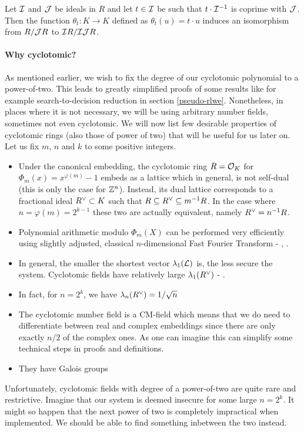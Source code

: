\begin{proposition}\label{sigma-t}
	Let $\mathcal{I}$ and $\mathcal{J}$ be ideals in $R$ and let $t \in \mathcal{I}$ be such that $t \cdot \mathcal{I}^{-1}$ is coprime with $\mathcal{J}$. Then the function $\theta_t : K \rightarrow K$ defined as $\theta_t(u) = t \cdot u$ induces an isomorphism from $R/\mathcal{J} R$ to $\mathcal{I} R/\mathcal{I} \mathcal{J} R$.
\end{proposition}


\paragraph{Why cyclotomic?}\label{why?}
As mentioned earlier, we wish to fix the degree of our cyclotomic polynomial to a power-of-two. This leads to greatly simplified proofs of some results like for example search-to-decision reduction in section \ref{pseudo-rlwe}. Nonetheless, in places where it is not necessary, we will be using arbitrary number fields, sometimes not even cyclotomic. We will now list few desirable properties of cyclotomic rings (also those of power of two) that will be useful for us later on. Let us fix $m$, $n$ and $k$ to some positive integers.
\begin{itemize}
	\item Under the canonical embedding, the cyclotomic ring $R = \mathcal{O}_K$ for $\Phi_m(x) = x^{\varphi(m)} - 1$ embeds as a lattice which in general, is not self-dual (this is only the case for $\mathbb{Z}^n$). Instead, its dual lattice corresponds to a fractional ideal $R^{\vee} \subset K$ such that $R \subseteq R^{\vee} \subseteq m^{-1}R$. In the case where $n = \varphi(m) =  2^{k-1}$ these two are actually equivalent, namely $R^{\vee} = n^{-1}R$. 
	\item Polynomial arithmetic modulo $\Phi_m(X)$ can be performed very efficiently using slightly adjusted, classical $n$-dimensional Fast Fourier Transform - \cite{toolkit}, \cite{swift}.
	\item In general, the smaller the shortest vector $\lambda_1(\mathcal{L})$ is, the less secure the system. Cyclotomic fields have relatively large $\lambda_1(R^{\vee})$ - \cite{oracle}.
	\item In fact, for $n = 2^k$, we have $\lambda_n(R^{\vee}) = 1/\sqrt{n}$
		\iffalse
	\item They also have relatively small \textit{expansion factors} (roughly speaking it is the ratio of the size of the public key to the size of the secret key) as defined and explained in \cite{expansion}.
		\fi
	\item The cyclotomic number field is a CM-field which means that we do need to differentiate between real and complex embeddings since there are only exactly $n/2$ of the complex ones. As one can imagine this can simplify some technical steps in proofs and definitions.
	\item They have Galois groups
\end{itemize}
Unfortunately, cyclotomic fields with degree of a power-of-two are quite rare and restrictive. Imagine that our system is deemed insecure for some large $n = 2^k$. It might so happen that the next power of two is completely impractical when implemented. We should be able to find something inbetween the two instead.
